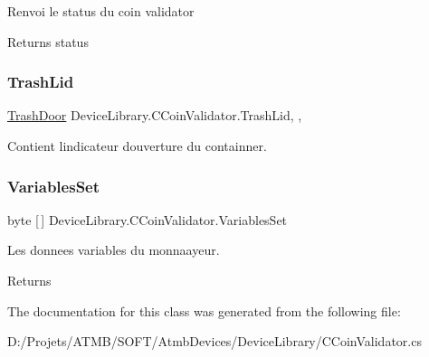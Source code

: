 Renvoi le status du coin validator 

\begin{DoxyReturn}{Returns}
status
\end{DoxyReturn}
\mbox{\label{class_device_library_1_1_c_coin_validator_aec2db3e243a0eb073f5392c41ee0c354}} 
\subsubsection{\texorpdfstring{Trash\+Lid}{TrashLid}}
{\footnotesize\ttfamily \mbox{\hyperlink{class_device_library_1_1_c_coin_validator_aec7d217f486dbce4458a64bc071fa19d}{Trash\+Door}} Device\+Library.\+C\+Coin\+Validator.\+Trash\+Lid\hspace{0.3cm}{\ttfamily [get]}, {\ttfamily [set]}, {\ttfamily [protected]}}



Contient l\textquotesingle{}indicateur d\textquotesingle{}ouverture du containner. 

\mbox{\label{class_device_library_1_1_c_coin_validator_a538e6fc08186ba969f190503cdc828c2}} 
\subsubsection{\texorpdfstring{Variables\+Set}{VariablesSet}}
{\footnotesize\ttfamily byte \mbox{[}$\,$\mbox{]} Device\+Library.\+C\+Coin\+Validator.\+Variables\+Set\hspace{0.3cm}{\ttfamily [get]}}



Les donnees variables du monnaayeur. 

\begin{DoxyReturn}{Returns}

\end{DoxyReturn}


The documentation for this class was generated from the following file\+:\begin{DoxyCompactItemize}
\item 
D\+:/\+Projets/\+A\+T\+M\+B/\+S\+O\+F\+T/\+Atmb\+Devices/\+Device\+Library/C\+Coin\+Validator.\+cs\end{DoxyCompactItemize}
